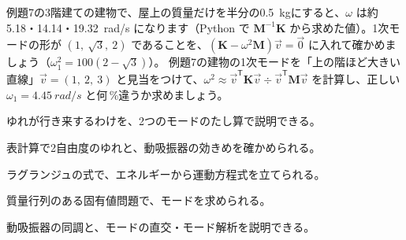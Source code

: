 \bkproblem 例題7の3階建ての建物で、屋上の質量だけを半分の\qty{0.5}{kg}にすると、$\omega$ は約5.18・14.14・\qty{19.32}{rad/s} になります（Python で $\mathbf M^{-1}\mathbf K$ から求めた値）。1次モードの形が $(1,\ \sqrt3,\ 2)$ であることを、$(\mathbf K-\omega^2\mathbf M)\vec v=\vec 0$ に入れて確かめましょう（$\omega_1^2=100(2-\sqrt3)$）。
\bkproblem 例題7の建物の1次モードを「上の階ほど大きい直線」$\vec v=(1,\ 2,\ 3)$ と見当をつけて、$\omega^2\approx\vec v^{\mathsf T}\mathbf K\vec v\div\vec v^{\mathsf T}\mathbf M\vec v$ を計算し、正しい $\omega_1=\qty{4.45}{rad/s}$ と何\,\%違うか求めましょう。

\begin{furikaeri}
\begin{checklist}
\item ゆれが行き来するわけを、2つのモードのたし算で説明できる。
\item 表計算で2自由度のゆれと、動吸振器の効きめを確かめられる。
\item ラグランジュの式で、エネルギーから運動方程式を立てられる。
\item 質量行列のある固有値問題で、モードを求められる。
\item 動吸振器の同調と、モードの直交・モード解析を説明できる。
\end{checklist}
\end{furikaeri}
